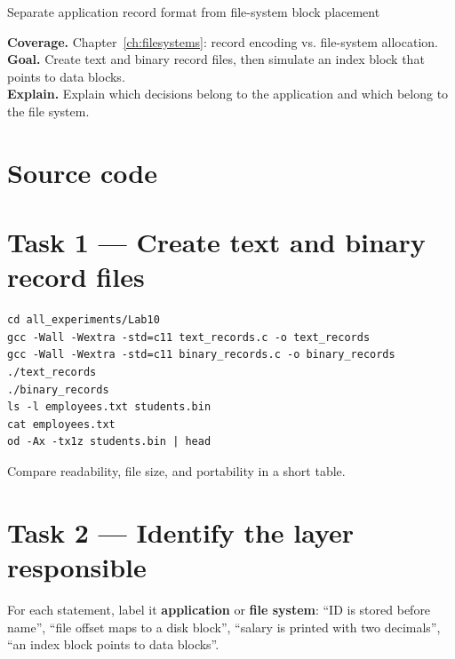 \begin{labproject}{Separate application record format from file-system block placement}

\textbf{Coverage.} Chapter~\ref{ch:filesystems}: record encoding vs. file-system allocation.\\
\textbf{Goal.} Create text and binary record files, then simulate an index block that points to data blocks.\\
\textbf{Explain.} Explain which decisions belong to the application and which belong to the file system.

\section*{Source code}






\section*{Task 1 --- Create text and binary record files}
\begin{lstlisting}[style=utpbash]
cd all_experiments/Lab10
gcc -Wall -Wextra -std=c11 text_records.c -o text_records
gcc -Wall -Wextra -std=c11 binary_records.c -o binary_records
./text_records
./binary_records
ls -l employees.txt students.bin
cat employees.txt
od -Ax -tx1z students.bin | head
\end{lstlisting}
Compare readability, file size, and portability in a short table.

\section*{Task 2 --- Identify the layer responsible}
For each statement, label it \textbf{application} or \textbf{file system}: ``ID is stored before name'', ``file offset maps to a disk block'', ``salary is printed with two decimals'', ``an index block points to data blocks''.


\end{labproject}
